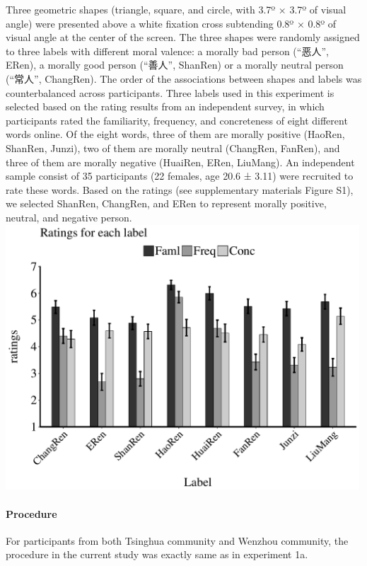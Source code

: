 \documentclass[
  english,
  man]{apa6}
\let\oldparagraph\paragraph
\renewcommand{\paragraph}[1]{\oldparagraph{#1}\mbox{}}
\begin{document}
Three geometric shapes (triangle, square, and circle, with 3.7º × 3.7º of visual angle) were presented above a white fixation cross subtending 0.8º × 0.8º of visual angle at the center of the screen. The three shapes were randomly assigned to three labels with different moral valence: a morally bad person (\enquote{恶人}, ERen), a morally good person (\enquote{善人}, ShanRen) or a morally neutral person (\enquote{常人}, ChangRen). The order of the associations between shapes and labels was counterbalanced across participants.
Three labels used in this experiment is selected based on the rating results from an independent survey, in which participants rated the familiarity, frequency, and concreteness of eight different words online. Of the eight words, three of them are morally positive (HaoRen, ShanRen, Junzi), two of them are morally neutral (ChangRen, FanRen), and three of them are morally negative (HuaiRen, ERen, LiuMang). An independent sample consist of 35 participants (22 females, age 20.6 ± 3.11) were recruited to rate these words. Based on the ratings (see supplementary materials Figure S1), we selected ShanRen, ChangRen, and ERen to represent morally positive, neutral, and negative person.
\includegraphics[width=5.20833in,height=\textheight]{exp1b/Familiarity_ratings/df1b_fami_rating.pdf}

\hypertarget{procedure-1}{%
\paragraph{Procedure}\label{procedure-1}}

For participants from both Tsinghua community and Wenzhou community, the procedure in the current study was exactly same as in experiment 1a.
\end{document}
